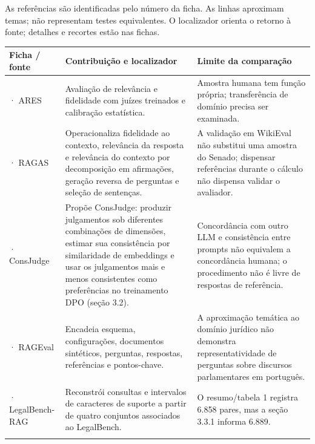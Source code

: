 As referências são identificadas pelo número da ficha. As linhas aproximam temas; não representam testes equivalentes. O localizador orienta o retorno à fonte; detalhes e recortes estão nas fichas.

{\small\renewcommand{\arraystretch}{1.3}
\begin{tabularx}{\textwidth}{@{}>{\raggedright\arraybackslash}p{29mm}>{\raggedright\arraybackslash}X>{\raggedright\arraybackslash}X@{}}
\toprule
\textbf{Ficha / fonte} & \textbf{Contribuição e localizador} & \textbf{Limite da comparação}\\
\midrule
01 · ARES & Avaliação de relevância e fidelidade com juízes treinados e calibração estatística.\par\smallskip{\footnotesize Seções 3–5} & Amostra humana tem função própria; transferência de domínio precisa ser examinada.\\
\addlinespace[5pt]
04 · RAGAS & Operacionaliza fidelidade ao contexto, relevância da resposta e relevância do contexto por decomposição em afirmações, geração reversa de perguntas e seleção de sentenças.\par\smallskip{\footnotesize seção 3, p. 152} & A validação em WikiEval não substitui uma amostra do Senado; dispensar referências durante o cálculo não dispensa validar o avaliador.\\
\addlinespace[5pt]
05 · ConsJudge & Propõe ConsJudge: produzir julgamentos sob diferentes combinações de dimensões, estimar sua consistência por similaridade de embeddings e usar os julgamentos mais e menos consistentes como preferências no treinamento DPO (seção 3.2).\par\smallskip{\footnotesize seção 3.1, p. 5790} & Concordância com outro LLM e consistência entre prompts não equivalem a concordância humana; o procedimento não é livre de respostas de referência.\\
\addlinespace[5pt]
06 · RAGEval & Encadeia esquema, configurações, documentos sintéticos, perguntas, respostas, referências e pontos-chave.\par\smallskip{\footnotesize Resumo, p. 8520} & A aproximação temática ao domínio jurídico não demonstra representatividade de perguntas sobre discursos parlamentares em português.\\
\addlinespace[5pt]
07 · LegalBench-RAG & Reconstrói consultas e intervalos de caracteres de suporte a partir de quatro conjuntos associados ao LegalBench.\par\smallskip{\footnotesize seção 3.3, p. 5} & O resumo/tabela 1 registra 6.858 pares, mas a seção 3.3.1 informa 6.889.\\
\addlinespace[5pt]
\bottomrule
\end{tabularx}}

